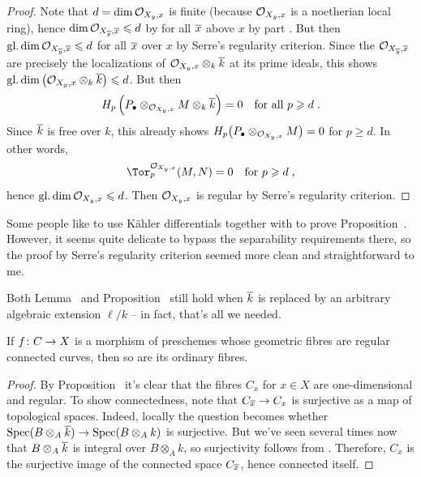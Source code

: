 \documentclass[a4paper,parskip=half,numbers=enddot, DIV=12]{scrreprt}
\renewcommand{\geq}{\geqslant}
\renewcommand{\leq}{\leqslant}
\begin{document}
\begin{proof}
	 Note that $d=\dim\mathcal{O}_{X_y,x}$ is finite (because $\mathcal{O}_{X_y,x}$ is a noetherian local ring), hence $\dim\Oo_{X_{\ov{y}},\ov{x}}\leq d$ by for all $\overline{x}$ above $x$ by part . But then $\gdim\Oo_{X_{\ov{y}},\ov{x}}\leq d$ for all $\overline{x}$ over $x$ by Serre's regularity criterion. Since the $\mathcal{O}_{X_{\overline{y}},\overline{x}}$ are precisely the localizations of $\mathcal{O}_{X_y,x}\otimes_k\overline{k}$ at its prime ideals, this shows $\gdim\big(\Oo_{X_y,x}\otimes_k\ov{k}\big)\leq d$. But then
	 \begin{align*}
	 	H_p\left(P_\bullet\otimes_{\Oo_{X_y,x}}M\otimes_k\ov{k}\right)=0\quad\text{for all }p\geq d\;.
	 \end{align*}
	 Since $\overline{k}$ is free over $k$, this already shows $H_p\big(P_\bullet\otimes_{\mathcal{O}_{X_y,x}}M\big)=0$ for $p\geq d$. In other words, 
	 \begin{align*}
	 	\Tor_p^{\Oo_{X_y,x}}(M,N)=0\quad\text{for }p\geq d\;,
	 \end{align*}
	 hence $\gdim\Oo_{X_y,x}\leq d$. Then $\mathcal{O}_{X_y,x}$ is regular by Serre's regularity criterion.
\end{proof}
\begin{rem}
	\begin{alphanumerate}
		\item Some people like to use Kähler differentials together with \cite[Proposition~1.6.3]{alg2} to prove Proposition~. However, it seems quite delicate to bypass the separability requirements there, so the proof by Serre's regularity criterion seemed more clean and straightforward to me.
		\item Both Lemma~ and Proposition~ still hold when $\overline{k}$ is replaced by an arbitrary algebraic extension $\ell/k$ -- in fact, that's all we needed.
	\end{alphanumerate}
\end{rem}
\begin{cor}
	If $f\colon C\morphism X$ is a morphism of preschemes whose geometric fibres are regular connected curves, then so are its ordinary fibres.
\end{cor}
\begin{proof}
	By Proposition~ it's clear that the fibres $C_x$ for $x\in X$ are one-dimensional and regular. To show connectedness, note that $C_{\ov{x}}\morphism C_x$ is surjective as a map of topological spaces. Indeed, locally the question becomes whether $\Spec(B\otimes_A\ov{k})\morphism\Spec (B\otimes_Ak)$ is surjective. But we've seen several times now that $B\otimes_A\overline{k}$ is integral over $B\otimes_Ak$, so surjectivity follows from \cite[Theorem~7]{alg1}. Therefore, $C_x$ is the surjective image of the connected space $C_{\overline{x}}$, hence connected itself.
\end{proof}

\printbibliography
\end{document}
